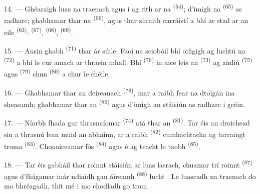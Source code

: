\VUsaut{3.0mm}
\VUsaut{3.0mm}

14. --- Ghéaraigh luas na traenach agus í ag rith ar na 
\textsuperscript{(64)}; d'imigh na  \textsuperscript{(65)} as radharc;
ghabhamar thar na  \textsuperscript{(66)}, agus thar shraith
carráistí a bhí ar stad ar an  eile \textsuperscript{(63)}:
 \textsuperscript{(67)}, 
\textsuperscript{(68)},  \textsuperscript{(69)}.


15. --- Ansin ghabh  \textsuperscript{(71)} thar ár
súile. Faoi na sciobóil bhí oifigigh ag luchtú na 
\textsuperscript{(72)} a bhí le cur amach ar thraein mhall. Bhí 
\textsuperscript{(76)} in aice leis an  \textsuperscript{(73)} ag
ainliú  \textsuperscript{(75)} agus  \textsuperscript{(79)} chun  \textsuperscript{(80)} a
chur le chéile.

16. --- Ghabhamar thar an  deireanach \textsuperscript{(78)}, mar a
raibh fear na dtolgán ina sheasamh; ghabhamar thar an 
\textsuperscript{(86)} agus d'imigh an stáisiún as radharc i gcéin.

17. --- Níorbh fhada gur thrasnaíomar 
\textsuperscript{(74)} atá thar an  \textsuperscript{(81)}. Tar éis an
droichead sin a thrasnú lean muid an abhainn, ar a raibh 
\textsuperscript{(82)} cumhachtacha ag tarraingt  troma
\textsuperscript{(83)}. Chonaiceamar fós 
\textsuperscript{(84)} agus é ag teacht le taobh 
\textsuperscript{(85)}.

18. --- Tar éis gabháil thar roinnt stáisiún ar luas lasrach, chuamar trí roinnt
 \textsuperscript{(87)} agus d'fhágamar inár ndiaidh  gan áireamh \textsuperscript{(88)} lucht .
Le luascadh na traenach do mo bhréagadh, thit mé i mo chodladh go trom.

\VUsaut{3.0mm}
\VUsaut{3.0mm}

